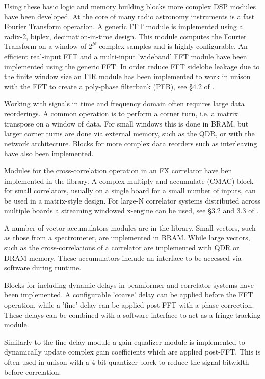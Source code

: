 \documentclass{ws-jai}
\begin{document}
Using these basic logic and memory building blocks more complex DSP modules have
been developed. At the core of many radio astronomy instruments is a fast Fourier
Transform operation. A generic FFT module is implemented using a radix-2,
biplex, decimation-in-time design. This module computes the Fourier Transform on
a window of $2^N$ complex samples and is highly configurable. An efficient
real-input FFT and a multi-input 'wideband' FFT module have been implemented
using the generic FFT. In order reduce FFT sidelobe leakage due to the finite
window size an FIR module has been implemented to work in unison with the FFT to
create a poly-phase filterbank (PFB), see \S 4.2 of \citet{price13}.

Working with signals in time and frequency domain often requires large data
reorderings. A common operation is to perform a corner turn, i.e. a matrix
transpose on a window of data. For small windows this is done in BRAM, but
larger corner turns are done via external memory, such as the QDR, or with the
network architecture. Blocks for more complex data reorders such as interleaving
have also been implemented.

Modules for the cross-correlation operation in an FX correlator have ben
implemented in the library. A complex multiply and accumulate (CMAC) block for
small correlators, usually on a single board for a small number of inputs, can
be used in a matrix-style design. For large-N correlator systems distributed
across multiple boards a streaming windowed x-engine can be used, see \S 3.2 and
3.3 of \citet{hickish14}.

A number of vector accumulators modules are in the library.
Small vectors, such as those from a spectrometer, are implemented in BRAM. While
large vectors, such as the cross-correlations of a correlator are implemented
with QDR or DRAM memory. These accumulators include an interface to be accessed
via software during runtime.

Blocks for including dynamic delays in beamformer and correlator systems have
been implemented. A configurable 'coarse' delay can be applied before the FFT
operation, while a 'fine' delay can be applied post-FFT with a phase correction.
These delays can be combined with a software interface to act as a fringe
tracking module.

Similarly to the fine delay module a gain equalizer module is implemented to
dynamically update complex gain coefficients which are applied post-FFT. This is
often used in unison with a 4-bit quantizer block to reduce the signal bitwidth
before correlation.
\end{document}
